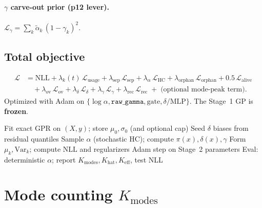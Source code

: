 \documentclass[11pt,a4paper]{article}
\newcommand{\Keff}{K_{\mathrm{eff}}}
\newcommand{\Khat}{K_{\mathrm{hat}}}
\newcommand{\Kmodes}{K_{\mathrm{modes}}}
\begin{document}
\paragraph{\(\gamma\) carve-out prior (p12 lever).}
\(
  \mathcal{L}_{\gamma}
  =
  \sum_k \tilde\alpha_k\,(1-\gamma_k)^2.
\)

\subsection{Total objective}
\begin{equation}
\boxed{
\begin{aligned}
  \mathcal{L}
  &=
  \mathrm{NLL}
  +
  \lambda_k(t)\,\mathcal{L}_{\mathrm{usage}}
  +
  \lambda_{\mathrm{sep}}\,\mathcal{L}_{\mathrm{sep}}
  +
  \lambda_{\alpha}\,\mathcal{L}_{\mathrm{HC}}
  +
  \lambda_{\mathrm{orphan}}\,\mathcal{L}_{\mathrm{orphan}}
  +
  0.5\,\mathcal{L}_{\mathrm{alive}}
  \\
  &\quad
  +
  \lambda_{\mathrm{ov}}\,\mathcal{L}_{\mathrm{ov}}
  +
  \lambda_{\delta}\,\mathcal{L}_{\delta}
  +
  \lambda_{\gamma}\,\mathcal{L}_{\gamma}
  +
  \lambda_{\mathrm{rec}}\,\mathcal{L}_{\mathrm{rec}}
  \;+\;
  \text{(optional mode-peak term)}.
\end{aligned}
}
\end{equation}
Optimized with Adam on \(\{\log\alpha,\texttt{raw\_gamma},\text{gate},\delta/\text{MLP}\}\).
The Stage~1 GP is \textbf{frozen}.

\begin{algorithm}[ht]
\caption{MidlineSparseMoE-GP training}
\begin{algorithmic}[1]
\State Fit exact GPR on \((X,y)\); store \(\mu_0,\sigma_0\) (and optional cap)
\State Seed \(\delta\) biases from residual quantiles
  \State Sample \(\alpha\) (stochastic HC); compute \(\pi(x),\delta(x),\gamma\)
  \State Form \(\mu_k,\mathrm{Var}_k\); compute \(\mathrm{NLL}\) and regularizers
  \State Adam step on Stage~2 parameters
\EndFor
\State Eval: deterministic \(\alpha\); report \(\Kmodes,\Khat,\Keff\), test NLL
\end{algorithmic}
\end{algorithm}

\section{Mode counting \(\Kmodes\)}
\end{document}
